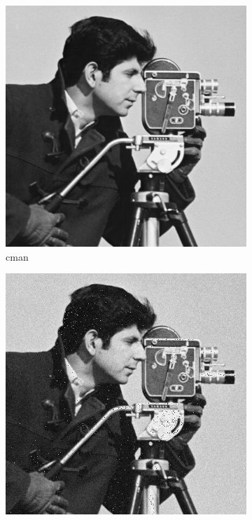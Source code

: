 \documentclass{article}\raggedbottom
\begin{document}
\begin{figure}[h!]
	\centering
	\begin{subfigure}[b]{0.45\linewidth}
		\includegraphics[width=\linewidth]{../../2_Software/data/cman_512_512.png}
		\caption{cman}
	\end{subfigure}
	\begin{subfigure}[b]{0.45\linewidth}
		\includegraphics[width=\linewidth]{../../2_Software/data/cman_gnoise.png}

\end{subfigure}
\end{figure}
\end{document}
